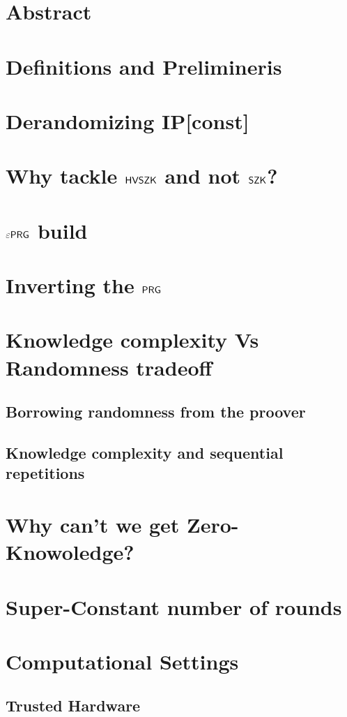 \documentclass[11]{article}
\begin{document}

\section{Abstract}

\section{Definitions and Prelimineris}

\section{Derandomizing IP[const]}

\section{Why tackle $\mathsf{HVSZK}$ and not $\mathsf{SZK}$?}

\section{$\varepsilon \mathsf{PRG}$ build}

\section{Inverting the $\mathsf{PRG}$}

\section{Knowledge complexity Vs Randomness tradeoff}

\subsection{Borrowing randomness from the proover}

\subsection{Knowledge complexity and sequential repetitions}

\section{Why can't we get Zero-Knowoledge?}

\section{Super-Constant number of rounds}

\section{Computational Settings}

\subsection{Trusted Hardware}


 
\end{document}
